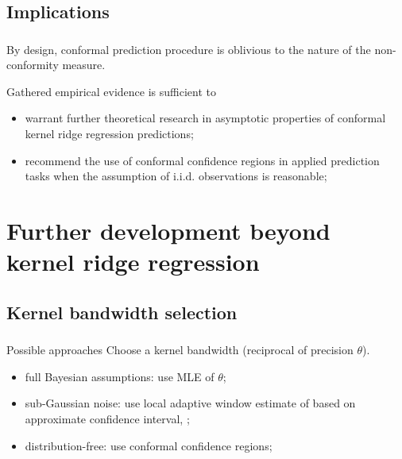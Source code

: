 \documentclass[t]{beamer}  %
\begin{document}

\subsection{Implications} %
\label{sub:implications}

\begin{frame}[c]\frametitle{\insertsection}
  \framesubtitle{\insertsubsection}
  By design, conformal prediction procedure is oblivious to the nature of
  the non-conformity measure.

  \vspace{\baselineskip}
  Gathered empirical evidence is sufficient to \begin{itemize}
    \item warrant further theoretical research in asymptotic properties of conformal
    kernel ridge regression predictions;
    \item recommend the use of conformal confidence regions in applied prediction
    tasks when the assumption of i.i.d. observations is reasonable;
  \end{itemize}
\end{frame}



\section{Further development beyond kernel ridge regression} %
\label{sec:further_development_beyond_krr}

\subsection{Kernel bandwidth selection} %
\label{sub:kernel_bandwidth_selection}

\begin{frame}[c]\frametitle{\insertsection}
  \framesubtitle{\insertsubsection}
  \begin{block}{Possible approaches}
    Choose a kernel bandwidth (reciprocal of precision $\theta$).

    \begin{itemize}
      \item full Bayesian assumptions: use MLE of $\theta$;
      \item sub-Gaussian noise: use local adaptive window estimate of
        based on approximate confidence interval, \cite{goldenshluger1997};
      \item distribution-free: use conformal confidence regions;
    \end{itemize}
  \end{block}
\end{frame}
\end{document}
